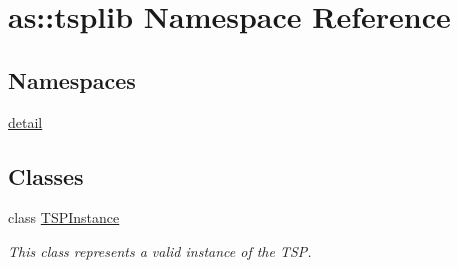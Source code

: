 \hypertarget{namespaceas_1_1tsplib}{}\section{as\+:\+:tsplib Namespace Reference}
\label{namespaceas_1_1tsplib}
\subsection*{Namespaces}
\begin{DoxyCompactItemize}
\item 
 \hyperlink{namespaceas_1_1tsplib_1_1detail}{detail}
\end{DoxyCompactItemize}
\subsection*{Classes}
\begin{DoxyCompactItemize}
\item 
class \hyperlink{classas_1_1tsplib_1_1TSPInstance}{T\+S\+P\+Instance}
\begin{DoxyCompactList}\small\item\em This class represents a valid instance of the T\+SP. \end{DoxyCompactList}\end{DoxyCompactItemize}

